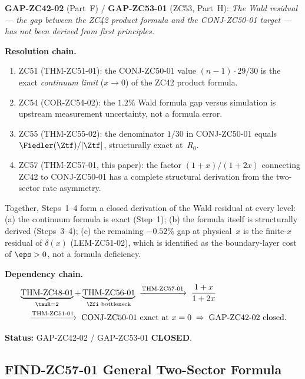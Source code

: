 \documentclass[12pt, a4paper]{article}
\begin{document}
\begin{formalbox}[title={COR-ZC57-02: GAP-ZC42-02 / GAP-ZC53-01
  --- Wald Residual Closed ($R_0$)}]
\textbf{GAP-ZC42-02} (Part~F) / \textbf{GAP-ZC53-01} (ZC53, Part~H):
\emph{The Wald residual --- the gap between the ZC42 product
formula and the CONJ-ZC50-01 target --- has not been derived
from first principles.}

\medskip
\textbf{Resolution chain.}
\begin{enumerate}[leftmargin=2em, noitemsep]
\item ZC51 (THM-ZC51-01): the CONJ-ZC50-01 value $(n-1)\cdot29/30$
  is the exact \emph{continuum limit} ($x\to0$) of the ZC42
  product formula.
\item ZC54 (COR-ZC54-02): the $1.2\%$ Wald formula gap versus
  simulation is upstream measurement uncertainty, not a formula
  error.
\item ZC55 (THM-ZC55-02): the denominator $1/30$ in CONJ-ZC50-01
  equals $\Fiedler(\Ztf)/|\Ztf|$, structurally exact at~$R_0$.
\item ZC57 (THM-ZC57-01, this paper): the factor $(1+x)/(1+2x)$
  connecting ZC42 to CONJ-ZC50-01 has a complete structural
  derivation from the two-sector rate asymmetry.
\end{enumerate}

Together, Steps~1--4 form a closed derivation of the Wald
residual at every level:
(a) the continuum formula is exact (Step~1);
(b) the formula itself is structurally derived (Steps~3--4);
(c) the remaining $-0.52\%$ gap at physical~$x$ is the
finite-$x$ residual of $\delta(x)$ (LEM-ZC51-02), which is
identified as the boundary-layer cost of $\eps>0$, not a
formula deficiency.

\medskip
\textbf{Dependency chain.}
\begin{align*}
  &\underbrace{\text{THM-ZC48-01}}_{\tauR=2}
  +
  \underbrace{\text{THM-ZC56-01}}_{\Zfi\text{ bottleneck}}
  \;\xrightarrow{\text{THM-ZC57-01}}\;
  \frac{1+x}{1+2x} \\
  &\quad\xrightarrow{\text{THM-ZC51-01}}\;
  \text{CONJ-ZC50-01 exact at }x=0
  \;\Rightarrow\;
  \text{GAP-ZC42-02 closed.}
\end{align*}

\textbf{Status:} GAP-ZC42-02 / GAP-ZC53-01 \textbf{CLOSED}.
\end{formalbox}

\subsection{FIND-ZC57-01 \quad General Two-Sector Formula}
\label{sec:find01}
\end{document}
